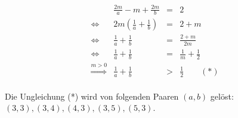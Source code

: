 \documentclass[11pt,a4paper,ngerman]{article}
\begin{document}
$$\begin{array}{lrcl}
    &\frac{2m}{a} - m + \frac{2m}{b} &=& 2\\
\Leftrightarrow &
    2m \left( \frac{1}{a} + \frac{1}{b}\right) &=& 2+m \\
\Leftrightarrow &
    \frac{1}{a} + \frac{1}{b} &=& \frac{2+m}{2m}\\
\Leftrightarrow &
    \frac{1}{a} + \frac{1}{b} &=& \frac{1}{m} + \frac{1}{2}\\
\stackrel{m > 0}{\Rightarrow} &
    \frac{1}{a} + \frac{1}{b} &>& \frac{1}{2} \qquad (*)\\
\end{array}$$

Die Ungleichung (*) wird von folgenden Paaren $(a,b)$ gelöst: $(3,3), (3,4), (4,3), (3,5), (5,3)$.
\label{LastPage}
\end{document}
